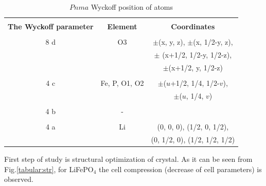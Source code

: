\documentclass[11pt]{article}
\begin{document}
\begin{table}[H]
\caption{$Pnma$ Wyckoff position of atoms}
\label{tabular:wyckoff}
\begin{center}
\begin{tabular}{|c|c|c|}
\hline
& & \\
 \textbf{The Wyckoff parameter} & \textbf{Element}  & \textbf{Coordinates}  \\
\hline
& & \\
8 d & O3 & $\pm$(x, y, z), $\pm$(x, 1/2-y, z), \\ 
  &  &  $\pm$ (x+1/2, 1/2-y, 1/2-z), \\
 &  &  $\pm$(x+1/2, y, 1/2-z)  \\
\hline
& & \\
4 c & Fe, P, O1, O2 & $\pm$($u$+1/2, 1/4, 1/2-$v$), \\
&  &   $\pm$($u$, 1/4, $v$) \\
\hline
& & \\
4 b & - & \\
\hline
& & \\
4 a & Li & (0, 0, 0), (1/2, 0, 1/2), \\
  &  &  (0, 1/2, 0), (1/2, 1/2, 1/2) \\
\hline
\end{tabular}
\end{center}
\end{table}


First step of study is structural optimization of crystal. As it can be seen from Fig.\ref{tabular:str}, for LiFePO$_4$ the cell compression (decrease of cell parameters) is observed. 
\end{document}
